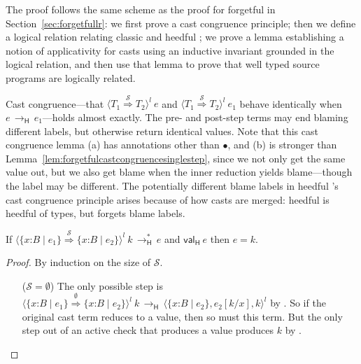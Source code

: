 \documentclass[9pt]{extarticle}
\newcommand{\ottnt}[1]{\mathit{#1}}
\newcommand{\ottsym}[1]{#1}
\begin{document}
{The proof follows the same scheme as the proof for forgetful \lambdah
in Section~\ref{sec:forgetfullr}: we first prove a cast congruence
principle; then we define a logical relation relating classic and
heedful \lambdah; we prove a lemma establishing a notion of
applicativity for casts using an inductive invariant grounded in the
logical relation, and then use that lemma to prove that well typed
source programs are logically related.

Cast congruence---that $ \langle  \ottnt{T_{{\mathrm{1}}}}  \mathord{ \overset{ \mathcal{S} }{\Rightarrow} }  \ottnt{T_{{\mathrm{2}}}}  \rangle^{ \ottnt{l} } ~  \ottnt{e} $ and $ \langle  \ottnt{T_{{\mathrm{1}}}}  \mathord{ \overset{ \mathcal{S} }{\Rightarrow} }  \ottnt{T_{{\mathrm{2}}}}  \rangle^{ \ottnt{l} } ~  \ottnt{e_{{\mathrm{1}}}} $
behave identically when $\ottnt{e} \,  \longrightarrow _{  \mathsf{H}  }  \, \ottnt{e_{{\mathrm{1}}}}$---holds almost exactly.  The
pre- and post-step terms may end blaming different labels, but
otherwise return identical values.
Note that this cast congruence lemma (a) has annotations other than
$ \bullet $, and (b) is stronger than
Lemma~\ref{lem:forgetfulcastcongruencesinglestep}, since we not only
get the same value out, but we also get blame when the inner reduction
yields blame---though the label may be different.
The potentially different blame labels in heedful \lambdah's cast
congruence principle arises because of how casts are merged: heedful
\lambdah is heedful of types, but forgets blame labels. 


\begin{lemma}
  \label{lem:heedfulfocast}
  If $ \langle   \{ \mathit{x} \mathord{:} \ottnt{B} \mathrel{\mid} \ottnt{e_{{\mathrm{1}}}} \}   \mathord{ \overset{ \mathcal{S} }{\Rightarrow} }   \{ \mathit{x} \mathord{:} \ottnt{B} \mathrel{\mid} \ottnt{e_{{\mathrm{2}}}} \}   \rangle^{ \ottnt{l} } ~  \ottnt{k}  \,  \longrightarrow ^{*}_{  \mathsf{H}  }  \, \ottnt{e}$ and $ \mathsf{val} _{  \mathsf{H}  }~ \ottnt{e} $ then
  $\ottnt{e}  \ottsym{=}  \ottnt{k}$.
\begin{proof}
    By induction on the size of $\mathcal{S}$.
{\iffull
      \begin{itemize}
      \item[($\mathcal{S}  \ottsym{=}  \emptyset$)] The only possible step is $ \langle   \{ \mathit{x} \mathord{:} \ottnt{B} \mathrel{\mid} \ottnt{e_{{\mathrm{1}}}} \}   \mathord{ \overset{ \emptyset }{\Rightarrow} }   \{ \mathit{x} \mathord{:} \ottnt{B} \mathrel{\mid} \ottnt{e_{{\mathrm{2}}}} \}   \rangle^{ \ottnt{l} } ~  \ottnt{k}  \,  \longrightarrow _{  \mathsf{H}  }  \,  \langle   \{ \mathit{x} \mathord{:} \ottnt{B} \mathrel{\mid} \ottnt{e_{{\mathrm{2}}}} \}  ,   \ottnt{e_{{\mathrm{2}}}}  [  \ottnt{k} / \mathit{x}  ]  ,  \ottnt{k}  \rangle^{ \ottnt{l} } $ by
        . So if the original cast term reduces to a
        value, then so must this term. But the only step out of an
        active check that produces a value produces $\ottnt{k}$ by
        .


\end{itemize}}
\end{proof}
\end{lemma}}
\end{document}
